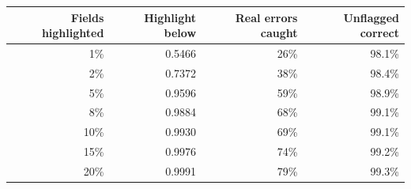\begin{tabular}{@{}rrrr@{}}
\toprule
Fields highlighted & Highlight below & Real errors caught & Unflagged correct \\
\midrule
1\% & 0.5466 & 26\% & 98.1\% \\
2\% & 0.7372 & 38\% & 98.4\% \\
5\% & 0.9596 & 59\% & 98.9\% \\
8\% & 0.9884 & 68\% & 99.1\% \\
10\% & 0.9930 & 69\% & 99.1\% \\
15\% & 0.9976 & 74\% & 99.2\% \\
20\% & 0.9991 & 79\% & 99.3\% \\
\bottomrule
\end{tabular}
